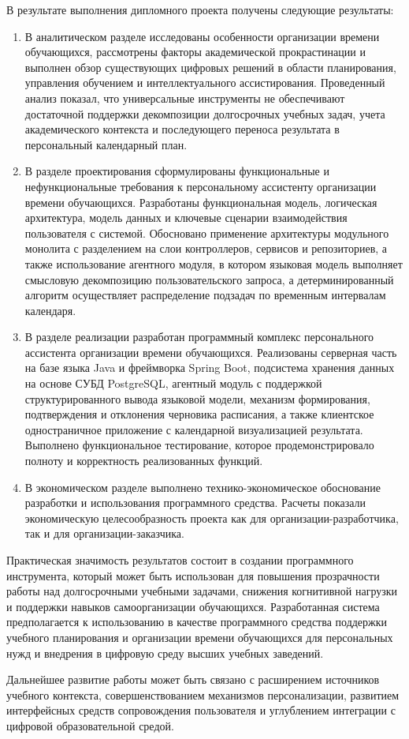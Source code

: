 
В результате выполнения дипломного проекта получены следующие результаты:

\begin{enumerate}[label=\arabic*]
    \item В аналитическом разделе исследованы особенности организации времени обучающихся, рассмотрены факторы академической прокрастинации и выполнен обзор существующих цифровых решений в области планирования, управления обучением и интеллектуального ассистирования. Проведенный анализ показал, что универсальные инструменты не обеспечивают достаточной поддержки декомпозиции долгосрочных учебных задач, учета академического контекста и последующего переноса результата в персональный календарный план.
    \item В разделе проектирования сформулированы функциональные и нефункциональные требования к персональному ассистенту организации времени обучающихся. Разработаны функциональная модель, логическая архитектура, модель данных и ключевые сценарии взаимодействия пользователя с системой. Обосновано применение архитектуры модульного монолита с разделением на слои контроллеров, сервисов и репозиториев, а также использование агентного модуля, в котором языковая модель выполняет смысловую декомпозицию пользовательского запроса, а детерминированный алгоритм осуществляет распределение подзадач по временным интервалам календаря.
    \item В разделе реализации разработан программный комплекс персонального ассистента организации времени обучающихся. Реализованы серверная часть на базе языка Java и фреймворка Spring Boot, подсистема хранения данных на основе СУБД PostgreSQL, агентный модуль с поддержкой структурированного вывода языковой модели, механизм формирования, подтверждения и отклонения черновика расписания, а также клиентское одностраничное приложение с календарной визуализацией результата. Выполнено функциональное тестирование, которое продемонстрировало полноту и корректность реализованных функций.
    \item В экономическом разделе выполнено технико-экономическое обоснование разработки и использования программного средства. Расчеты показали экономическую целесообразность проекта как для организации-разработчика, так и для организации-заказчика.
\end{enumerate}

Практическая значимость результатов состоит в создании программного инструмента, который может быть использован для повышения прозрачности работы над долгосрочными учебными задачами, снижения когнитивной нагрузки и поддержки навыков самоорганизации обучающихся. Разработанная система предполагается к использованию в качестве программного средства поддержки учебного планирования и организации времени обучающихся для персональных нужд и внедрения в цифровую среду высших учебных заведений.

Дальнейшее развитие работы может быть связано с расширением источников учебного контекста, совершенствованием механизмов персонализации, развитием интерфейсных средств сопровождения пользователя и углублением интеграции с цифровой образовательной средой.
